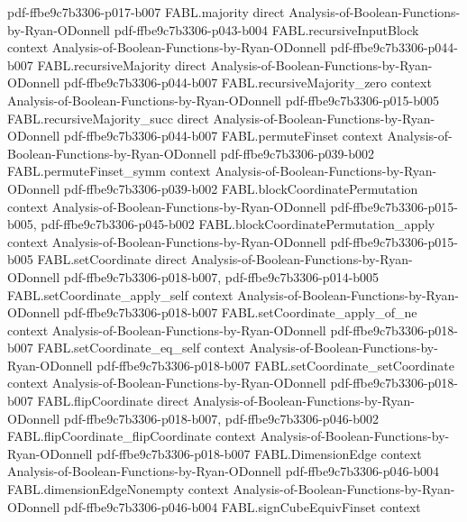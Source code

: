 \begin{theorem}
  {pdf-ffbe9c7b3306-p017-b007}
\proofstep
  {FABL.majority}
  {direct}
  {Analysis-of-Boolean-Functions-by-Ryan-ODonnell}
  {pdf-ffbe9c7b3306-p043-b004}
\proofstep
  {FABL.recursiveInputBlock}
  {context}
  {Analysis-of-Boolean-Functions-by-Ryan-ODonnell}
  {pdf-ffbe9c7b3306-p044-b007}
\proofstep
  {FABL.recursiveMajority}
  {direct}
  {Analysis-of-Boolean-Functions-by-Ryan-ODonnell}
  {pdf-ffbe9c7b3306-p044-b007}
\proofstep
  {FABL.recursiveMajority_zero}
  {context}
  {Analysis-of-Boolean-Functions-by-Ryan-ODonnell}
  {pdf-ffbe9c7b3306-p015-b005}
\proofstep
  {FABL.recursiveMajority_succ}
  {direct}
  {Analysis-of-Boolean-Functions-by-Ryan-ODonnell}
  {pdf-ffbe9c7b3306-p044-b007}
\proofstep
  {FABL.permuteFinset}
  {context}
  {Analysis-of-Boolean-Functions-by-Ryan-ODonnell}
  {pdf-ffbe9c7b3306-p039-b002}
\proofstep
  {FABL.permuteFinset_symm}
  {context}
  {Analysis-of-Boolean-Functions-by-Ryan-ODonnell}
  {pdf-ffbe9c7b3306-p039-b002}
\proofstep
  {FABL.blockCoordinatePermutation}
  {context}
  {Analysis-of-Boolean-Functions-by-Ryan-ODonnell}
  {pdf-ffbe9c7b3306-p015-b005,
    pdf-ffbe9c7b3306-p045-b002}
\proofstep
  {FABL.blockCoordinatePermutation_apply}
  {context}
  {Analysis-of-Boolean-Functions-by-Ryan-ODonnell}
  {pdf-ffbe9c7b3306-p015-b005}
\proofstep
  {FABL.setCoordinate}
  {direct}
  {Analysis-of-Boolean-Functions-by-Ryan-ODonnell}
  {pdf-ffbe9c7b3306-p018-b007,
    pdf-ffbe9c7b3306-p014-b005}
\proofstep
  {FABL.setCoordinate_apply_self}
  {context}
  {Analysis-of-Boolean-Functions-by-Ryan-ODonnell}
  {pdf-ffbe9c7b3306-p018-b007}
\proofstep
  {FABL.setCoordinate_apply_of_ne}
  {context}
  {Analysis-of-Boolean-Functions-by-Ryan-ODonnell}
  {pdf-ffbe9c7b3306-p018-b007}
\proofstep
  {FABL.setCoordinate_eq_self}
  {context}
  {Analysis-of-Boolean-Functions-by-Ryan-ODonnell}
  {pdf-ffbe9c7b3306-p018-b007}
\proofstep
  {FABL.setCoordinate_setCoordinate}
  {context}
  {Analysis-of-Boolean-Functions-by-Ryan-ODonnell}
  {pdf-ffbe9c7b3306-p018-b007}
\proofstep
  {FABL.flipCoordinate}
  {direct}
  {Analysis-of-Boolean-Functions-by-Ryan-ODonnell}
  {pdf-ffbe9c7b3306-p018-b007,
    pdf-ffbe9c7b3306-p046-b002}
\proofstep
  {FABL.flipCoordinate_flipCoordinate}
  {context}
  {Analysis-of-Boolean-Functions-by-Ryan-ODonnell}
  {pdf-ffbe9c7b3306-p018-b007}
\proofstep
  {FABL.DimensionEdge}
  {context}
  {Analysis-of-Boolean-Functions-by-Ryan-ODonnell}
  {pdf-ffbe9c7b3306-p046-b004}
\proofstep
  {FABL.dimensionEdgeNonempty}
  {context}
  {Analysis-of-Boolean-Functions-by-Ryan-ODonnell}
  {pdf-ffbe9c7b3306-p046-b004}
\proofstep
  {FABL.signCubeEquivFinset}
  {context}

\end{theorem}

